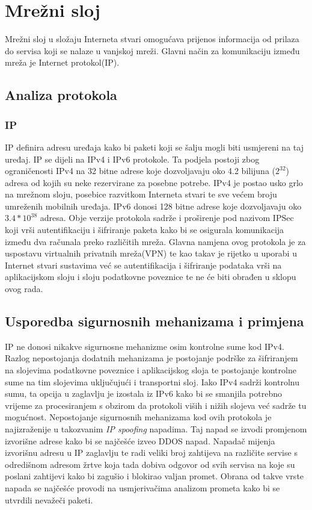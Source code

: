 \documentclass[times, utf8, diplomski]{fer}
\begin{document}
\section{Mrežni sloj}
Mrežni sloj u složaju Interneta stvari omogućava prijenos informacija od prilaza do servisa koji se nalaze u vanjskoj mreži. Glavni način za komunikaciju između mreža je Internet protokol(IP). 

\subsection{Analiza protokola}
\subsubsection{IP}
IP definira adresu uređaja kako bi paketi koji se šalju mogli biti usmjereni na taj uređaj. IP se dijeli na IPv4 i IPv6 protokole. Ta podjela postoji zbog ograničenosti IPv4 na 32 bitne adrese koje dozvoljavaju oko 4.2 bilijuna ($2^{32}$) adresa od kojih su neke rezervirane za posebne potrebe. IPv4 je postao usko grlo na mrežnom sloju, posebice razvitkom Interneta stvari te sve većem broju umreženih mobilnih uređaja. IPv6 donosi 128 bitne adrese koje dozvoljavaju oko $3.4*10^{38}$ adresa. Obje verzije protokola sadrže i proširenje pod nazivom IPSec  koji vrši autentifikaciju i šifriranje paketa kako bi se osigurala komunikacija između dva računala preko različitih mreža. Glavna namjena ovog protokola je za uspostavu virtualnih privatnih mreža(VPN) te kao takav je rijetko u uporabi u Internet stvari sustavima već se autentifikacija i šifriranje podataka vrši na aplikacijskom sloju i sloju podatkovne poveznice te ne će biti obrađen u sklopu ovog rada. 

\subsection{Usporedba sigurnosnih mehanizama i primjena}
IP ne donosi nikakve sigurnosne mehanizme osim kontrolne sume kod IPv4. Razlog nepostojanja dodatnih mehanizama je postojanje podrške za šifriranjem na slojevima podatkovne poveznice i aplikacijskog sloja te postojanje kontrolne sume na tim slojevima uključujući i transportni sloj. Iako IPv4 sadrži kontrolnu sumu, ta opcija u zaglavlju je izostala iz IPv6 kako bi se smanjila potrebno vrijeme za procesiranjem s obzirom da protokoli viših i nižih slojeva već sadrže tu mogućnost. Nepostojanje sigurnosnih mehanizama kod ovih protokola je najizraženije u takozvanim \emph{IP spoofing} napadima. Taj napad se izvodi promjenom izvorišne adrese kako bi se najčešće izveo DDOS  napad. Napadač mijenja izvorišnu adresu u IP zaglavlju te radi veliki broj zahtijeva na različite servise s odredišnom adresom žrtve koja tada dobiva odgovor od svih servisa na koje su poslani zahtijevi kako bi zagušio i blokirao valjan promet. Obrana od takve vrste napada se najčešće provodi na usmjerivačima analizom prometa kako bi se utvrdili nevažeči paketi. 
\end{document}
